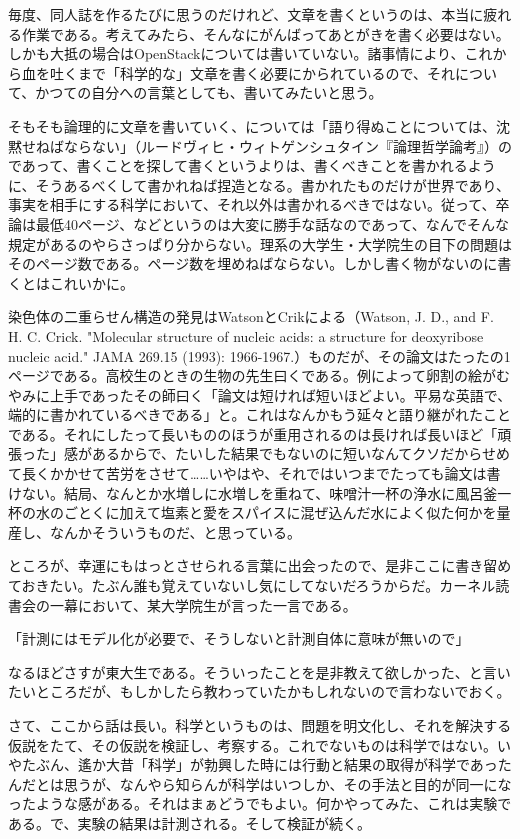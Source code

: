 \documentclass[9pt,b5paper,tombo,openany]{jsbook}
\begin{document}
毎度、同人誌を作るたびに思うのだけれど、文章を書くというのは、本当に疲れる作業である。考えてみたら、そんなにがんばってあとがきを書く必要はない。しかも大抵の場合はOpenStackについては書いていない。諸事情により、これから血を吐くまで「科学的な」文章を書く必要にかられているので、それについて、かつての自分への言葉としても、書いてみたいと思う。

そもそも論理的に文章を書いていく、については「語り得ぬことについては、沈黙せねばならない」（ルードヴィヒ・ウィトゲンシュタイン『論理哲学論考』）のであって、書くことを探して書くというよりは、書くべきことを書かれるように、そうあるべくして書かれねば捏造となる。書かれたものだけが世界であり、事実を相手にする科学において、それ以外は書かれるべきではない。従って、卒論は最低40ページ、などというのは大変に勝手な話なのであって、なんでそんな規定があるのやらさっぱり分からない。理系の大学生・大学院生の目下の問題はそのページ数である。ページ数を埋めねばならない。しかし書く物がないのに書くとはこれいかに。

染色体の二重らせん構造の発見はWatsonとCrikによる（Watson, J. D., and F. H. C. Crick. "Molecular structure of nucleic acids: a structure for deoxyribose nucleic acid." JAMA 269.15 (1993): 1966-1967.）ものだが、その論文はたったの1ページである。高校生のときの生物の先生曰くである。例によって卵割の絵がむやみに上手であったその師曰く「論文は短ければ短いほどよい。平易な英語で、端的に書かれているべきである」と。これはなんかもう延々と語り継がれたことである。それにしたって長いもののほうが重用されるのは長ければ長いほど「頑張った」感があるからで、たいした結果でもないのに短いなんてクソだからせめて長くかかせて苦労をさせて……いやはや、それではいつまでたっても論文は書けない。結局、なんとか水増しに水増しを重ねて、味噌汁一杯の浄水に風呂釜一杯の水のごとくに加えて塩素と愛をスパイスに混ぜ込んだ水によく似た何かを量産し、なんかそういうものだ、と思っている。

ところが、幸運にもはっとさせられる言葉に出会ったので、是非ここに書き留めておきたい。たぶん誰も覚えていないし気にしてないだろうからだ。カーネル読書会の一幕において、某大学院生が言った一言である。

「計測にはモデル化が必要で、そうしないと計測自体に意味が無いので」

なるほどさすが東大生である。そういったことを是非教えて欲しかった、と言いたいところだが、もしかしたら教わっていたかもしれないので言わないでおく。

さて、ここから話は長い。科学というものは、問題を明文化し、それを解決する仮説をたて、その仮説を検証し、考察する。これでないものは科学ではない。いやたぶん、遙か大昔「科学」が勃興した時には行動と結果の取得が科学であったんだとは思うが、なんやら知らんが科学はいつしか、その手法と目的が同一になったような感がある。それはまぁどうでもよい。何かやってみた、これは実験である。で、実験の結果は計測される。そして検証が続く。
\end{document}
